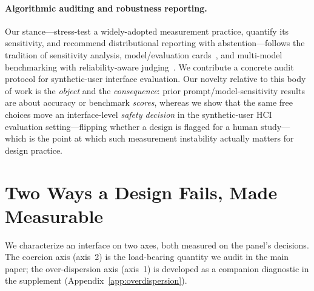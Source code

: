 \documentclass[manuscript,review,anonymous]{acmart}
\begin{document}
\paragraph{Algorithmic auditing and robustness reporting.} Our stance---stress-test a widely-adopted
measurement practice, quantify its sensitivity, and recommend distributional reporting with
abstention---follows the tradition of sensitivity analysis, model/evaluation cards~\cite{mitchell2019model},
and multi-model benchmarking with reliability-aware judging~\cite{zheng2023judging}. We contribute a
concrete audit protocol for synthetic-user interface evaluation. Our novelty relative to this body of work
is the \emph{object} and the \emph{consequence}: prior prompt/model-sensitivity results are about accuracy
or benchmark \emph{scores}, whereas we show that the same free choices move an interface-level \emph{safety
decision} in the synthetic-user HCI evaluation setting---flipping whether a design is flagged for a human
study---which is the point at which such measurement instability actually matters for design practice.

\section{Two Ways a Design Fails, Made Measurable}
\label{sec:definitions}

We characterize an interface on two axes, both measured on the panel's decisions. The coercion axis
(axis~2) is the load-bearing quantity we audit in the main paper; the over-dispersion axis (axis~1) is
developed as a companion diagnostic in the supplement (Appendix~\ref{app:overdispersion}).
\end{document}
